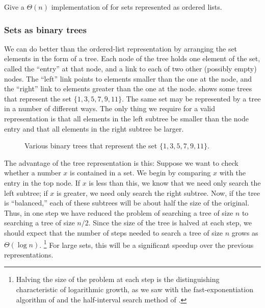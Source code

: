\begin{exercise}
	\label{Exercise 2.62}
	Give a \( Θ(n) \) implementation of  for sets represented as ordered lists.
\end{exercise}



\subsubsection*{Sets as binary trees}

We can do better than the ordered-list representation by arranging the set elements in the form of a tree.
Each node of the tree holds one element of the set, called the “entry” at that node, and a link to each of two other (possibly empty) nodes.
The “left” link points to elements smaller than the one at the node, and the “right” link to elements greater than the one at the node.
 shows some trees that represent the set \( \{1, 3, 5, 7, 9, 11\} \).
The same set may be represented by a tree in a number of different ways.
The only thing we require for a valid representation is that all elements in the left subtree be smaller than the node entry and that all elements in the right subtree be larger.

\begin{figure}[tb]
	\centering
	
	\caption{
		Various binary trees that represent the set \( \{1, 3, 5, 7, 9, 11\} \).
	}
	\label{Figure 2.16}
\end{figure}

The advantage of the tree representation is this:
Suppose we want to check whether a number \( x \) is contained in a set.
We begin by comparing \( x \) with the entry in the top node.
If \( x \) is less than this, we know that we need only search the left subtree;
if \( x \) is greater, we need only search the right subtree.
Now, if the tree is “balanced,” each of these subtrees will be about half the size of the original.
Thus, in one step we have reduced the problem of searching a tree of size \( n \) to searching a tree of size \( n / 2 \).
Since the size of the tree is halved at each step, we should expect that the number of steps needed to search a tree of size \( n \) grows as \( Θ(\log n) \).%
\footnote{
	Halving the size of the problem at each step is the distinguishing characteristic of logarithmic growth, as we saw with the fast-exponentiation algorithm of  and the half-interval search method of .
}
For large sets, this will be a significant speedup over the previous representations.

